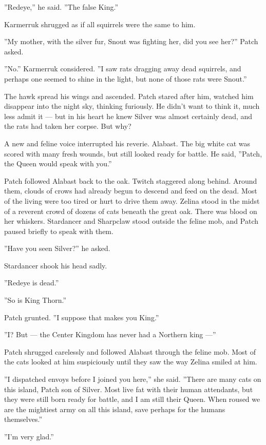 \documentclass[12pt]{book}
\begin{document}
''Redeye,'' he said. ''The false King.''

Karmerruk shrugged as if all squirrels were the same to him.

''My mother, with the silver fur, Snout was fighting her, did you see
her?'' Patch asked.

''No.'' Karmerruk considered. ''I saw rats dragging away dead
squirrels, and perhaps one seemed to shine in the light, but none of
those rats were Snout.''

The hawk spread his wings and ascended. Patch stared after him,
watched him disappear into the night sky, thinking furiously. He
didn't want to think it, much less admit it --- but in his heart he
knew Silver was almost certainly dead, and the rats had taken her
corpse. But why?

A new and feline voice interrupted his reverie. Alabast. The big white
cat was scored with many fresh wounds, but still looked ready for
battle. He said, ''Patch, the Queen would speak with you.''

Patch followed Alabast back to the oak. Twitch staggered along
behind. Around them, clouds of crows had already begun to descend and
feed on the dead. Most of the living were too tired or hurt to drive
them away. Zelina stood in the midst of a reverent crowd of dozens of
cats beneath the great oak. There was blood on her
whiskers. Stardancer and Sharpclaw stood outside the feline mob, and
Patch paused briefly to speak with them.

''Have you seen Silver?'' he asked.

Stardancer shook his head sadly.

''Redeye is dead.''

''So is King Thorn.''

Patch grunted. ''I suppose that makes you King.''

''I? But --- the Center Kingdom has never had a Northern king ---''

Patch shrugged carelessly and followed Alabast through the feline
mob. Most of the cats looked at him suspiciously until they saw the
way Zelina smiled at him.

''I dispatched envoys before I joined you here,'' she said. ''There
are many cats on this island, Patch son of Silver. Most live fat with
their human attendants, but they were still born ready for battle, and
I am still their Queen. When roused we are the mightiest army on all
this island, save perhaps for the humans themselves.''

''I'm very glad.''
\end{document}
